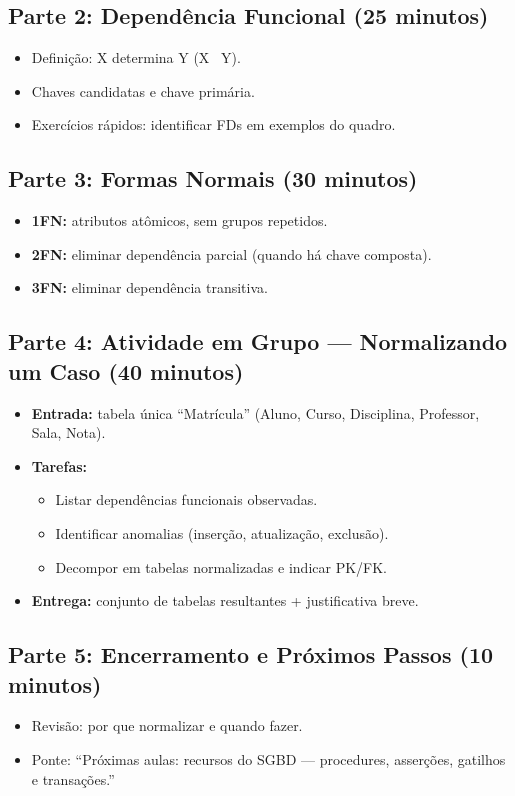 \documentclass[12pt,a4paper]{article}
\begin{document}
\subsection*{Parte 2: Dependência Funcional (25 minutos)}
\begin{itemize}[leftmargin=*,itemsep=0.35em]
  \item Definição: X determina Y (X \textrightarrow\ Y).
  \item Chaves candidatas e chave primária.
  \item Exercícios rápidos: identificar FDs em exemplos do quadro.
\end{itemize}

\subsection*{Parte 3: Formas Normais (30 minutos)}
\begin{itemize}[leftmargin=*,itemsep=0.35em]
  \item \textbf{1FN:} atributos atômicos, sem grupos repetidos.
  \item \textbf{2FN:} eliminar dependência parcial (quando há chave composta).
  \item \textbf{3FN:} eliminar dependência transitiva.
\end{itemize}

\subsection*{Parte 4: Atividade em Grupo --- Normalizando um Caso (40 minutos)}
\begin{itemize}[leftmargin=*,itemsep=0.35em]
  \item \textbf{Entrada:} tabela única ``Matrícula'' (Aluno, Curso, Disciplina, Professor, Sala, Nota).
  \item \textbf{Tarefas:}
  \begin{itemize}[leftmargin=*,itemsep=0.25em]
    \item Listar dependências funcionais observadas.
    \item Identificar anomalias (inserção, atualização, exclusão).
    \item Decompor em tabelas normalizadas e indicar PK/FK.
  \end{itemize}
  \item \textbf{Entrega:} conjunto de tabelas resultantes + justificativa breve.
\end{itemize}

\subsection*{Parte 5: Encerramento e Próximos Passos (10 minutos)}
\begin{itemize}[leftmargin=*,itemsep=0.35em]
  \item Revisão: por que normalizar e quando fazer.
  \item Ponte: ``Próximas aulas: recursos do SGBD --- procedures, asserções, gatilhos e transações.''
\end{itemize}
\end{document}
